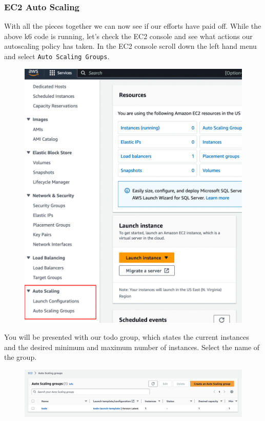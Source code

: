 \documentclass{csse4400}
\begin{document}
\subsubsection{EC2 Auto Scaling}

With all the pieces together we can now see if our efforts have paid off.
While the above k6 code is running, let's check the EC2 console and see what actions our autoscaling policy has taken.
In the EC2 console scroll down the left hand menu and select \texttt{Auto Scaling Groups}.

\begin{figure}[H]
  \begin{center}
    \includegraphics[scale=0.5]{images/ec2_1}
  \end{center}
\end{figure}

You will be presented with our todo group, which states the current instances and the desired minimum and maximum number of instances.
Select the name of the group.

\begin{figure}[H]
  \begin{center}
    \includegraphics[width=\textwidth]{images/ec2_3}
  \end{center}
\end{figure}
\end{document}
